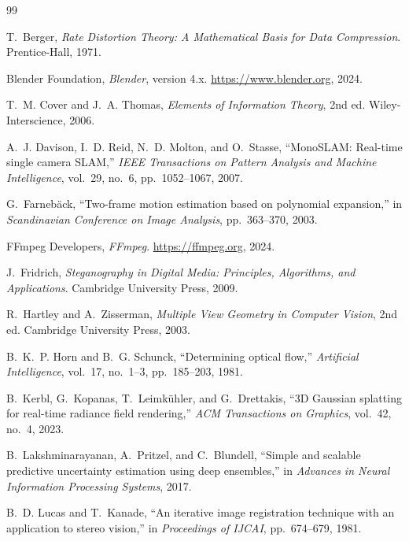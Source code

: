 \documentclass[12pt,a4paper]{article}
\theoremstyle{plain}
\theoremstyle{definition}
\theoremstyle{remark}
\begin{document}
\begin{thebibliography}{99}

T.~Berger, \textit{Rate Distortion Theory: A Mathematical Basis for Data Compression}. Prentice-Hall, 1971.

Blender Foundation, \textit{Blender}, version 4.x. \url{https://www.blender.org}, 2024.

T.~M. Cover and J.~A. Thomas, \textit{Elements of Information Theory}, 2nd ed. Wiley-Interscience, 2006.

A.~J. Davison, I.~D. Reid, N.~D. Molton, and O.~Stasse, ``MonoSLAM: Real-time single camera SLAM,'' \textit{IEEE Transactions on Pattern Analysis and Machine Intelligence}, vol.~29, no.~6, pp.~1052--1067, 2007.

G.~Farneb{\"a}ck, ``Two-frame motion estimation based on polynomial expansion,'' in \textit{Scandinavian Conference on Image Analysis}, pp.~363--370, 2003.

FFmpeg Developers, \textit{FFmpeg}. \url{https://ffmpeg.org}, 2024.

J.~Fridrich, \textit{Steganography in Digital Media: Principles, Algorithms, and Applications}. Cambridge University Press, 2009.

R.~Hartley and A.~Zisserman, \textit{Multiple View Geometry in Computer Vision}, 2nd ed. Cambridge University Press, 2003.

B.~K.~P. Horn and B.~G. Schunck, ``Determining optical flow,'' \textit{Artificial Intelligence}, vol.~17, no.~1--3, pp.~185--203, 1981.

B.~Kerbl, G.~Kopanas, T.~Leimk{\"u}hler, and G.~Drettakis, ``3D Gaussian splatting for real-time radiance field rendering,'' \textit{ACM Transactions on Graphics}, vol.~42, no.~4, 2023.

B.~Lakshminarayanan, A.~Pritzel, and C.~Blundell, ``Simple and scalable predictive uncertainty estimation using deep ensembles,'' in \textit{Advances in Neural Information Processing Systems}, 2017.

B.~D. Lucas and T.~Kanade, ``An iterative image registration technique with an application to stereo vision,'' in \textit{Proceedings of IJCAI}, pp.~674--679, 1981.


\end{thebibliography}
\end{document}
